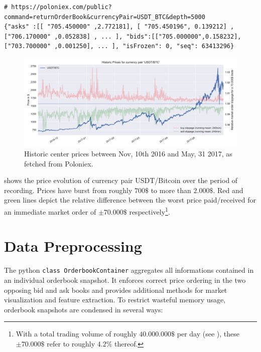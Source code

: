 \begin{lstlisting}[frame=single, breaklines=true, basicstyle=\scriptsize, caption=Data fetched from Poloniex via HTTP GET request, label=lst:PoloniexFetch]
# https://poloniex.com/public?command=returnOrderBook&currencyPair=USDT_BTC&depth=5000
{"asks" :[[ "705.450000" ,2.772181], [ "705.450196", 0.139212] ,["706.170000" ,0.052838] , ... ], "bids":[["705.000000",0.158232],["703.700000" ,0.001250], ... ], "isFrozen": 0, "seq": 63413296}
\end{lstlisting}

\begin{figure}[ht]
	\centering
   \includegraphics[width=1.\textwidth]{content/drawings/bitcoin_historicPrices}
	\caption{Historic center prices between Nov, 10th 2016 and May, 31 2017, as fetched from Poloniex.}
	\label{fig:ploniexPriceHistory}
\end{figure}

 shows the price evolution of currency pair USDT/Bitcoin over the period of recording. Prices have burst from roughly $700\$$ to more than $2.000\$$. Red and green lines depict the relative difference between the worst price paid/received for an immediate market order of $\pm70.000\$$ respectively\footnote{With a total trading volume of roughly $40.000.000\$$ per day (see ), these $\pm70.000\$$ refer to roughly $4.2\%$ thereof.}.

\hspace{1cm}

\section{Data Preprocessing}
\label{chap:preprocessing}
The python \lstinline!class OrderbookContainer! aggregates all informations contained in an individual orderbook snapshot. It enforces correct price ordering in the two opposing bid and ask books and provides additional methods for market visualization and feature extraction. To restrict wasteful memory usage, orderbook snapshots are condensed in several ways:

